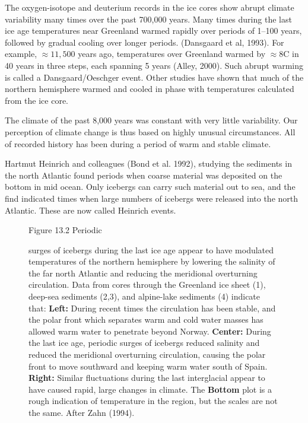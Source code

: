 \begin{enumerate}
\vitem The oxygen-isotope and deuterium records in the ice cores show abrupt climate variability many times over the past 700,000 years. Many times during the last ice age temperatures near Greenland warmed rapidly over periods of 1--100 years, followed by gradual cooling over longer periods. (Dansgaard et al, 1993). For example, $\approx 11,500$ years ago, temperatures over Greenland warmed by $\approx 8$\degrees C in 40 years in three steps, each spanning 5 years (Alley, 2000). Such abrupt warming is called a Dansgaard/Oeschger event. Other studies have shown that much of the northern hemisphere warmed and cooled in phase with temperatures calculated from the ice core.

\vitem The climate of the past 8,000 years was constant with very little variability. Our perception of climate change is thus based on highly unusual circumstances. All of recorded history has been during a period of warm and stable climate.

\vitem Hartmut Heinrich and colleagues (Bond et al. 1992), studying the sediments in the north Atlantic found periods when coarse material was deposited on the bottom in mid ocean. Only icebergs can carry such material out to sea, and the find indicated times when large numbers of icebergs were released into the north Atlantic. These are now called Heinrich events. 

\begin{figure}[t!]
\footnotesize
Figure 13.2 Periodic \rule{0mm}{3ex}surges of icebergs during the last ice age  appear to have modulated temperatures of the northern hemisphere by lowering the salinity of the far north Atlantic and reducing the meridional overturning circulation. Data from cores through the Greenland ice sheet (1), deep-sea sediments (2,3), and alpine-lake sediments (4) indicate that:
\textbf{Left:} During recent times the circulation has been stable, and the polar front which separates warm and cold water masses has allowed warm water to penetrate beyond Norway.
\textbf{Center:} During the last ice age, periodic surges of icebergs reduced salinity and reduced the meridional overturning circulation, causing the polar front to move southward and keeping warm water south of Spain. 
\textbf{Right:} Similar fluctuations during the last interglacial appear to have caused rapid, large changes in climate. The \textbf{Bottom} plot is a rough indication of temperature in the region, but the scales are not the same. After Zahn (1994).
\label{fig:NAiceage}
\vspace{-3ex}
\end{figure}


\end{enumerate}
